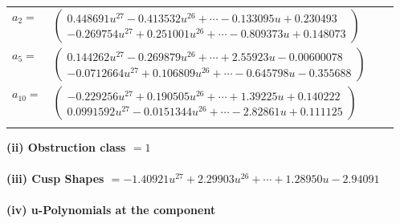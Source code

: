 \documentclass[1p]{elsarticle_modified}
\theoremstyle{definition}
\begin{document}
\begin{tabular}{m{7pt} m{180pt} m{7pt} m{180pt} }
\flushright $a_{2}=$&$\begin{pmatrix}0.448691 u^{27}-0.413532 u^{26}+\cdots-0.133095 u+0.230493\\-0.269754 u^{27}+0.251001 u^{26}+\cdots-0.809373 u+0.148073\end{pmatrix}$ \\
\flushright $a_{5}=$&$\begin{pmatrix}0.144262 u^{27}-0.269879 u^{26}+\cdots+2.55923 u-0.00600078\\-0.0712664 u^{27}+0.106809 u^{26}+\cdots-0.645798 u-0.355688\end{pmatrix}$ \\
\flushright $a_{10}=$&$\begin{pmatrix}-0.229256 u^{27}+0.190505 u^{26}+\cdots+1.39225 u+0.140222\\0.0991592 u^{27}-0.0151344 u^{26}+\cdots-2.82861 u+0.111125\end{pmatrix}$\\&\end{tabular}
\flushleft \textbf{(ii) Obstruction class $= 1$}\\~\\
\flushleft \textbf{(iii) Cusp Shapes $= -1.40921 u^{27}+2.29903 u^{26}+\cdots+1.28950 u-2.94091$}\\~\\
\newpage\renewcommand{\arraystretch}{1}
\flushleft \textbf{(iv) u-Polynomials at the component}\newline \\
\end{document}
